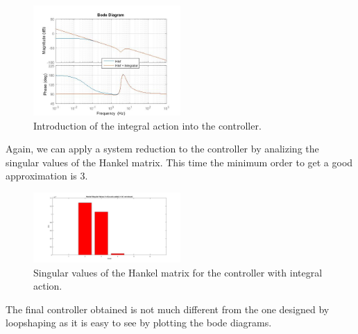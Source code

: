 \begin{figure}[h]
\centering
\includegraphics[width=0.5\textwidth]{img/hinf_integrator.jpg}
\caption{Introduction of the integral action into the controller.}
\end{figure}
Again, we can apply a system reduction to the controller by analizing the singular values of the Hankel matrix. This time the minimum order to get a good approximation is 3.\\

\begin{figure}[h]
\centering
\includegraphics[width=0.5\textwidth]{img/hinf_hankel_int.jpg}
\caption{Singular values of the Hankel matrix for the controller with integral action.}
\end{figure}

The final controller obtained is not much different from the one designed by loopshaping as it is easy to see by plotting the bode diagrams.





